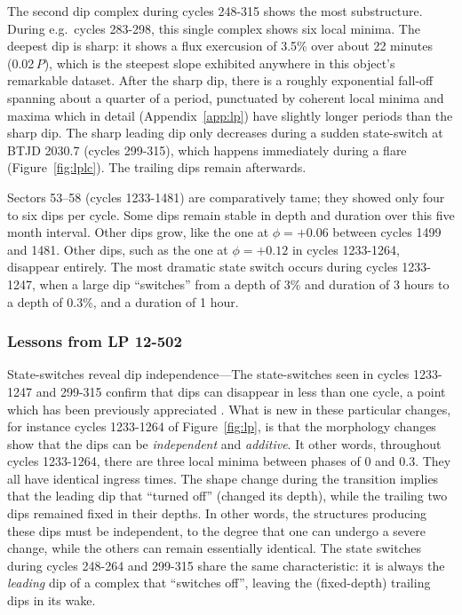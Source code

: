 \documentclass[11pt,twocolumn,tighten]{aastex63}
\begin{document}
The second dip complex during cycles 248-315 shows the most
substructure.  During e.g.~cycles 283-298, this single complex shows
six local minima.  The deepest dip is sharp: it shows a flux
exercusion of 3.5\% over about 22 minutes (0.02\,$P$), which is the
steepest slope exhibited anywhere in this object's remarkable dataset.
After the sharp dip, there is a roughly exponential fall-off spanning
about a quarter of a period, punctuated by coherent local minima and
maxima which in detail (Appendix~\ref{app:lp}) have slightly longer
periods than the sharp dip.  The sharp leading dip only decreases
during a sudden state-switch at BTJD 2030.7 (cycles 299-315), which
happens immediately during a flare (Figure~\ref{fig:lplc}).  The
trailing dips remain afterwards.

Sectors 53--58 (cycles 1233-1481) are comparatively tame; they showed
only four to six dips per cycle.  Some dips remain stable in depth and
duration over this five month interval.  Other dips grow, like the one
at $\phi = +0.06$ between cycles 1499 and 1481.  Other dips, such as
the one at $\phi = +0.12$ in cycles 1233-1264, disappear entirely.
The most dramatic state switch occurs during cycles 1233-1247, when a
large dip ``switches'' from a depth of 3\% and duration of 3 hours to
a depth of 0.3\%, and a duration of 1 hour.


\subsubsection{Lessons from LP 12-502}

{\sc State-switches reveal dip independence}---The state-switches seen
in cycles 1233-1247 and 299-315 confirm that dips can disappear in
less than one cycle, a point which has been previously appreciated
\citep{2017AJ....153..152S}.  What is new in these particular changes,
for instance cycles 1233-1264 of Figure~\ref{fig:lp}, is that the
morphology changes show that the dips can be {\it independent} and
{\it additive}.  It other words, throughout cycles 1233-1264, there
are three local minima between phases of 0 and 0.3.  They all have
identical ingress times.  The shape change during the transition
implies that the leading dip that ``turned off'' (changed its depth),
while the trailing two dips remained fixed in their depths.  In other
words, the structures producing these dips must be independent, to the
degree that one can undergo a severe change, while the others can
remain essentially identical.  The state switches during cycles
248-264 and 299-315 share the same characteristic: it is always the
{\it leading} dip of a complex that ``switches off'', leaving the
(fixed-depth) trailing dips in its wake.
\end{document}
